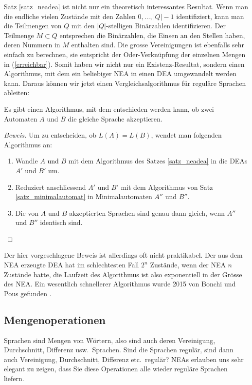 Satz \ref{satz_neadea} ist nicht nur ein theoretisch interessantes
Resultat.
Wenn man die endliche vielen Zustände mit den Zahlen
$0,\dots,|Q|-1$ identifiziert, kann man die Teilmengen von $Q$ mit
den $|Q|$-stelligen Binärzahlen identifizieren.
Der Teilmenge $M\subset Q$ entsprechen die Binärzahlen, die Einsen an
den Stellen haben, deren Nummern in $M$ enthalten sind.
Die grosse Vereinigungen ist ebenfalls sehr einfach
zu berechnen, sie entspricht der Oder-Verknüpfung
der einzelnen Mengen in (\ref{erreichbar}).
Somit haben wir nicht nur ein Existenz-Resultat, sondern einen
Algorithmus, mit dem ein beliebiger NEA in einen DEA umgewandelt
werden kann.
Daraus können wir jetzt einen Vergleichsalgorithmus für reguläre
Sprachen ableiten: 

\begin{satz}
Es gibt einen Algorithmus, mit dem entschieden werden kann, ob
zwei Automaten $A$ und $B$ die gleiche Sprache akzeptieren.
\end{satz}

\begin{proof}[Beweis]
Um zu entscheiden, ob $L(A)=L(B)$, wendet man folgenden Algorithmus
an:
\begin{enumerate}
\item Wandle $A$ und $B$
mit dem Algorithmus des Satzes 
\ref{satz_neadea} in die DEAs $A'$ und $B'$ um.
\item Reduziert anschliessend $A'$ und $B'$  mit dem Algorithmus
von Satz \ref{satz_minimalautomat} in Minimalautomaten
$A''$ und $B''$.
\item Die von $A$ und $B$ akzeptierten Sprachen sind genau dann
gleich, wenn $A''$ und $B''$ identisch sind.
\end{enumerate}
\end{proof}

Der hier vorgeschlagene Beweis ist allerdings oft nicht praktikabel.
Der aus dem NEA erzeugte DEA hat im schlechtesten Fall $2^n$
Zustände, wenn der NEA $n$ Zustände hatte, die Laufzeit des
Algorithmus ist also exponentiell in der Grösse des NEA.
Ein wesentlich schnellerer Algorithmus wurde 2015 von Bonchi und Pous
gefunden \cite{skript:bonchi-pous}.

\subsection{Mengenoperationen\label{regulaer:mengenoperationen}}
Sprachen sind Mengen von Wörtern, also sind auch deren Vereinigung,
Durchschnitt, Differenz usw.~Sprachen.
Sind die Sprachen regulär,
sind dann auch Vereinigung, Durchschnitt, Differenz etc.~regulär? 
NEAs erlauben uns sehr elegant zu zeigen, dass Sie diese Operationen
alle wieder reguläre Sprachen liefern.

